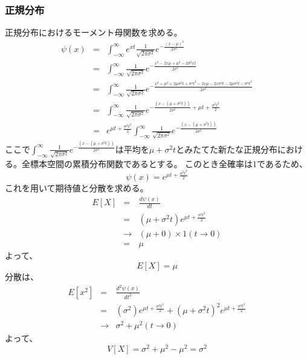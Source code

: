 \documentclass[a4paper,10pt]{jarticle}
\begin{document}
\subsubsection{正規分布}
正規分布におけるモーメント母関数を求める。
\begin{eqnarray*}
    \psi(x) &=& \int_{-\infty}^\infty e^{xt}\frac{1}{\sqrt{2\pi\sigma^2}}e^{-\frac{(x-\mu)^2}{2\sigma^2}}\\
        &=& \int_{-\infty}^\infty \frac{1}{\sqrt{2\pi\sigma^2}}e^{-\frac{x^2-2x\mu+\mu^2-2\sigma^2xt}{2\sigma^2}}\\
        &=& \int_{-\infty}^\infty \frac{1}{\sqrt{2\pi\sigma^2}}e^{-\frac{x^2+\mu^2+2\mu\sigma^2t+\sigma^4t^2-2x\mu-2x\sigma^2t-2\mu\sigma^2t-\sigma^4t^2}{2\sigma^2}}\\
        &=& \int_{-\infty}^\infty \frac{1}{\sqrt{2\pi\sigma^2}}e^{-\frac{(x-(\mu+\sigma^2t))}{2\sigma^2}+\mu t +\frac{\sigma^2t^2}{2}}\\
        &=& e^{\mu t+\frac{\sigma^2t^2}{2}}\int_{-\infty}^\infty \frac{1}{\sqrt{2\pi\sigma^2}}e^{-\frac{(x-(\mu+\sigma^2t))}{2\sigma^2}}
\end{eqnarray*}
ここで$\int_{-\infty}^\infty \frac{1}{\sqrt{2\pi\sigma^2}}e^{-\frac{(x-(\mu+\sigma^2t))}{2\sigma^2}}$は平均を$\mu+\sigma^2t$とみたてた新たな正規分布における。全標本空間の累積分布関数であるとする。
このとき全確率は1であるため、
\begin{equation}
    \psi(x) = e^{\mu t+\frac{\sigma^2t^2}{2}}\tag{3,50}
\end{equation}
これを用いて期待値と分散を求める。
\begin{eqnarray*}
    E[X] &=& \frac{d\psi(x)}{dt}\\
    &=& (\mu+\sigma^2t)e^{\mu t+\frac{\sigma^2t^2}{2}}\\
    &\rightarrow&(\mu+0)\times 1(t\rightarrow 0)\\
    &=& \mu
\end{eqnarray*}
よって、
\begin{equation}
    E[X] = \mu\tag{3,51}
\end{equation}
分散は、
\begin{eqnarray*}
    E[x^2] &=& \frac{d^2\psi(x)}{dt^2}\\
    &=& (\sigma^2)e^{\mu t+\frac{\sigma^2t^2}{2}}+(\mu+\sigma^2t)^2e^{\mu t+\frac{\sigma^2t^2}{2}}\\
    &\rightarrow& \sigma^2+\mu^2(t\rightarrow 0)
\end{eqnarray*}
よって、
\begin{equation}
    V[X] = \sigma^2 + \mu^2 - \mu^2 = \sigma^2 \tag{3,52}
\end{equation}
\end{document}
